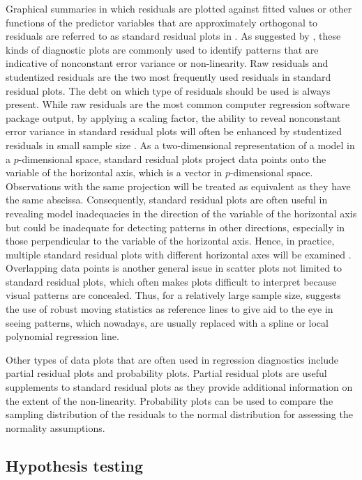 \documentclass[]{interact}
\theoremstyle{plain}%
\theoremstyle{definition}
\theoremstyle{remark}
\begin{document}
Graphical summaries in which residuals are plotted against fitted values
or other functions of the predictor variables that are approximately
orthogonal to residuals are referred to as standard residual plots in
\citet{cook1982residuals}. As suggested by \citet{cook1982residuals},
these kinds of diagnostic plots are commonly used to identify patterns
that are indicative of nonconstant error variance or non-linearity. Raw
residuals and studentized residuals are the two most frequently used
residuals in standard residual plots. The debt on which type of
residuals should be used is always present. While raw residuals are the
most common computer regression software package output, by applying a
scaling factor, the ability to reveal nonconstant error variance in
standard residual plots will often be enhanced by studentized residuals
in small sample size \citep{gunst1980regression}. As a two-dimensional
representation of a model in a \(p\)-dimensional space, standard
residual plots project data points onto the variable of the horizontal
axis, which is a vector in \(p\)-dimensional space. Observations with
the same projection will be treated as equivalent as they have the same
abscissa. Consequently, standard residual plots are often useful in
revealing model inadequacies in the direction of the variable of the
horizontal axis but could be inadequate for detecting patterns in other
directions, especially in those perpendicular to the variable of the
horizontal axis. Hence, in practice, multiple standard residual plots
with different horizontal axes will be examined
\citep{cook1982residuals}. Overlapping data points is another general
issue in scatter plots not limited to standard residual plots, which
often makes plots difficult to interpret because visual patterns are
concealed. Thus, for a relatively large sample size,
\citet{cleveland1975graphical} suggests the use of robust moving
statistics as reference lines to give aid to the eye in seeing patterns,
which nowadays, are usually replaced with a spline or local polynomial
regression line.

Other types of data plots that are often used in regression diagnostics
include partial residual plots and probability plots. Partial residual
plots are useful supplements to standard residual plots as they provide
additional information on the extent of the non-linearity. Probability
plots can be used to compare the sampling distribution of the residuals
to the normal distribution for assessing the normality assumptions.

\hypertarget{hypothesis-testing}{%
\subsection{Hypothesis testing}\label{hypothesis-testing}}
\end{document}
